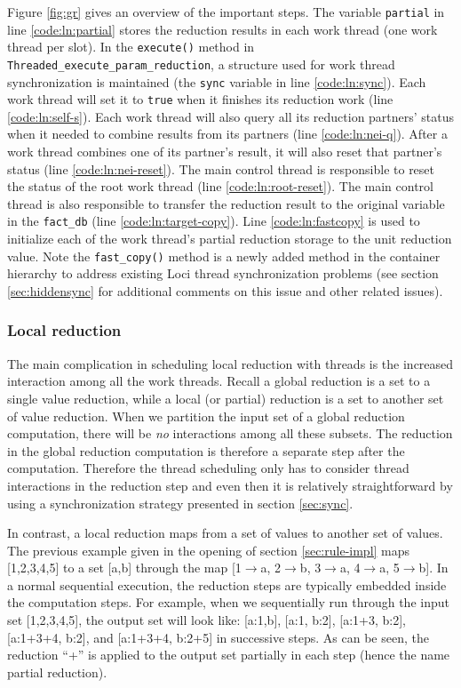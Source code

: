 \documentclass{article}
\begin{document}
Figure \ref{fig:gr} gives an overview of the important steps.  The
variable \lstinline{partial} in line \ref{code:ln:partial} stores the
reduction results in each work thread (one work thread per slot).  In the
\lstinline{execute()} method in
\lstinline{Threaded_execute_param_reduction}, a structure used for work
thread synchronization is maintained (the \lstinline{sync} variable in
line \ref{code:ln:sync}).  Each work thread will set it to
\lstinline{true} when it finishes its reduction work (line
\ref{code:ln:self-s}).  Each work thread will also query all its
reduction partners' status when it needed to combine results from its
partners (line \ref{code:ln:nei-q}).  After a work thread combines one
of its partner's result, it will also reset that partner's status (line
\ref{code:ln:nei-reset}).  The main control thread is responsible to
reset the status of the root work thread (line
\ref{code:ln:root-reset}).  The main control thread is also responsible
to transfer the reduction result to the original variable in the
\lstinline{fact_db} (line \ref{code:ln:target-copy}).  Line
\ref{code:ln:fastcopy} is used to initialize each of the work thread's
partial reduction storage to the unit reduction value.  Note the
\lstinline{fast_copy()} method is a newly added method in the container
hierarchy to address existing Loci thread synchronization problems (see
section \ref{sec:hiddensync} for additional comments on this issue and
other related issues).

\subsubsection{Local reduction}
\label{sec:localredux}
The main complication in scheduling local reduction with threads is the
increased interaction among all the work threads.  Recall a global
reduction is a set to a single value reduction, while a local (or
partial) reduction is a set to another set of value reduction.  When we
partition the input set of a global reduction computation, there will be
{\em no} interactions among all these subsets.  The reduction in the
global reduction computation is therefore a separate step after the
computation.  Therefore the thread scheduling only has to consider
thread interactions in the reduction step and even then it is relatively
straightforward by using a synchronization strategy presented in section
\ref{sec:sync}.

In contrast, a local reduction maps from a set of values to another set
of values.  The previous example given in the opening of section
\ref{sec:rule-impl} maps [1,2,3,4,5] to a set [a,b] through the map
[1$\to$a, 2$\to$b, 3$\to$a, 4$\to$a, 5$\to$b].  In a normal sequential
execution, the reduction steps are typically embedded inside the
computation steps.  For example, when we sequentially run through the
input set [1,2,3,4,5], the output set will look like: [a:1,b],
[a:1, b:2], [a:1+3, b:2], [a:1+3+4, b:2], and [a:1+3+4, b:2+5] in
successive steps.  As can be seen, the reduction ``+'' is applied to the
output set partially in each step (hence the name partial reduction).
\end{document}
